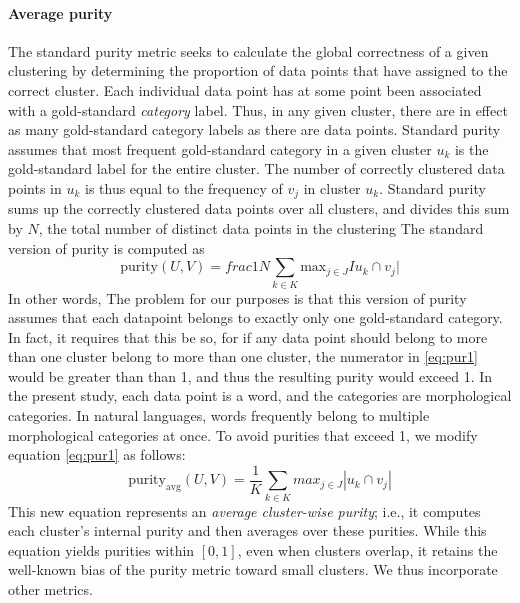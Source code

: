 \paragraph{Average purity}
The standard purity metric seeks to calculate the global correctness of a given clustering by determining the proportion of data points that have assigned to the correct cluster. Each individual data point has at some point been associated with a gold-standard \emph{category} label. Thus, in any given cluster, there are in effect as many gold-standard category labels as there are data points. Standard purity assumes that most frequent 
 gold-standard category in a given cluster $u_k$ is the gold-standard label for the entire cluster. The number of correctly clustered data points in $u_k$ is thus equal to the frequency of  $v_j$ in cluster $u_k$. Standard purity sums up the correctly clustered data points over all clusters, and divides this sum by $N$, the total number of distinct data points in the clustering
 The standard version of purity is computed as 
\begin{equation} \label{eq:pur1}
\text{purity}(U, V) = frac{1}{N} \sum_{k \in K} \text{max}_{j \in J} I u_k \cap v_j|
\end{equation}
In other words, 
The problem for our purposes is that this version of purity assumes that each datapoint belongs to exactly only one gold-standard category. In fact, it requires that this be so, for if any data point should belong to more than one cluster belong to more than one cluster, the numerator in \eqref{eq:pur1} would be greater than than 1, and thus the resulting purity would exceed 1.
In the present study, each data point is a word, and the categories are morphological categories. In natural languages, words frequently belong to multiple morphological categories at once.
To avoid purities that exceed 1, we modify equation \eqref{eq:pur1} as follows: 
\begin{equation} \label{eq:pur2}
\text{purity}_{\text{avg}}(U, V) =  \frac{1}{K} \sum_{k \in K} max_{j \in J} |u_k \cap v_j|
\end{equation}
This new equation represents an \emph{average cluster-wise purity}; i.e., it computes each cluster's internal purity and then averages over these purities. %
While this equation yields purities within $[0, 1]$, even 
when clusters overlap, it retains the well-known bias of the purity metric toward small clusters. We thus incorporate other metrics. 


